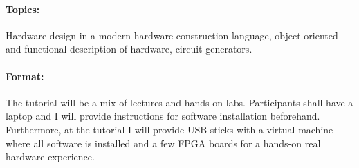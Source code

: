 \documentclass{article}
\begin{document}
\paragraph{Topics:} Hardware design in a modern hardware construction language, object oriented and
functional description of hardware, circuit generators.

\paragraph{Format:}
The tutorial will be a mix of lectures and hands-on labs. Participants shall have a laptop and I will provide
instructions for software installation beforehand. Furthermore, at the tutorial I will provide USB sticks
with a virtual machine where all software is installed and a few FPGA boards for a hands-on real
hardware experience.
\end{document}
